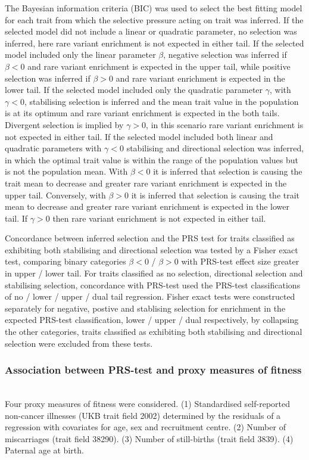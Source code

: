 \documentclass[times]{zHenriquesLab-StyleBioRxiv}
\begin{document}
The Bayesian information criteria (BIC) was used to select the best
fitting model for each trait from which the selective pressure acting
on trait was inferred. If the selected model did not include a linear
or quadratic parameter, no selection was inferred, here rare variant
enrichment is not expected in either tail. If the selected model
included only the linear parameter $\beta$, negative selection was
inferred if $\beta<0$ and rare variant enrichment is expected in the
upper tail, while positive selection was inferred if $\beta>0$ and
rare variant enrichment is expected in the lower tail. If the selected
model included only the quadratic parameter $\gamma$, with $\gamma<0$,
stabilising selection is inferred and the mean trait value in the
population is at its optimum and rare variant enrichment is expected
in the both tails. Divergent selection is implied by $\gamma>0$, in
this scenario rare variant enrichment is not expected in either
tail. If the selected model included both linear and quadratic
parameters with $\gamma<0$ stabilising and directional selection was
inferred, in which the optimal trait value is within the range of the
population values but is not the population mean. With
$\beta<0$ it is inferred that selection is causing the trait mean to
decrease and greater rare variant enrichment is expected in the upper
tail. Conversely, with $\beta>0$ it is inferred that selection is
causing the trait mean to decrease and greater rare variant enrichment
is expected in the lower tail.  If $\gamma>0$ then rare variant
enrichment is not expected in either tail.

Concordance between inferred selection and the PRS test for traits
classified as exhibiting both stabilising and directional selection
was tested by a Fisher exact test, comparing binary categories
$\beta<0$ / $\beta>0$ with PRS-test effect size greater in upper /
lower tail.  For traits classified as no selection, directional
selection and stabilising selection, concordance with PRS-test used
the PRS-test classifications of no / lower / upper / dual tail
regression. Fisher exact tests were constructed separately for
negative, postive and stablising selection for enrichment in the
expected PRS-test classification, lower / upper / dual respectively,
by collapsing the other categories, traits classified as exhibiting
both stabilising and directional selection were excluded from these
tests.

\subsubsection*{Association between PRS-test and proxy measures of fitness}~\\
Four proxy measures of fitness were considered. (1) Standardised
self-reported non-cancer illnesses (UKB trait field 2002) determined
by the residuals of a regression with covariates for age, sex and
recruitment centre. (2) Number of miscarriages (trait field
38290). (3) Number of still-births (trait field 3839). (4) Paternal
age at birth.
\end{document}
